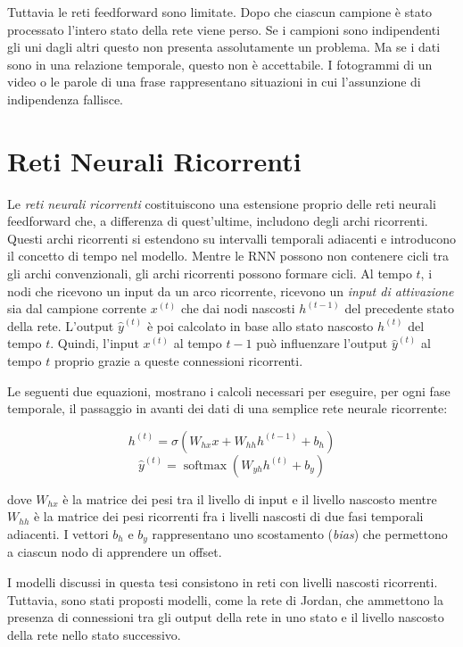 Tuttavia le reti feedforward sono limitate. Dopo che ciascun campione \`e stato
processato l'intero stato della rete viene perso. Se i campioni sono indipendenti
gli uni dagli altri questo non presenta assolutamente un problema. Ma se i dati
sono in una relazione temporale, questo non \`e accettabile. I fotogrammi di un
video o le parole di una frase rappresentano situazioni in cui l'assunzione di
indipendenza fallisce.

\section{Reti Neurali Ricorrenti}

Le \emph{reti neurali ricorrenti} costituiscono una estensione proprio delle reti
neurali feedforward che, a differenza di quest'ultime, includono degli archi ricorrenti.
Questi archi ricorrenti si estendono su intervalli temporali adiacenti e introducono
il concetto di tempo nel modello. Mentre le RNN possono non contenere cicli tra
gli archi convenzionali, gli archi ricorrenti possono formare cicli. Al tempo $t$,
i nodi che ricevono un input da un arco ricorrente, ricevono un \emph{input di
attivazione} sia dal campione corrente $x^{(t)}$ che dai nodi nascosti $h^{(t-1)}$
del precedente stato della rete. L'output $\hat{y}^{(t)}$ \`e poi calcolato in
base allo stato nascosto $h^{(t)}$ del tempo $t$. Quindi, l'input $x^{(t)}$ al
tempo $t-1$ pu\`o influenzare l'output $\hat{y}^{(t)}$ al tempo $t$ proprio grazie
a queste connessioni ricorrenti.

Le seguenti due equazioni, mostrano i calcoli necessari per eseguire, per ogni
fase temporale, il passaggio in avanti dei dati di una semplice rete neurale
ricorrente:

\begin{equation}
  h^{(t)} = \sigma(W_{hx}x + W_{hh}h^{(t-1)} + b_h)
\end{equation}
\begin{equation}
  \hat{y}^{(t)} = \operatorname{softmax}(W_{yh}h^{(t)} + b_y)
\end{equation}

dove $W_{hx}$ \`e la matrice dei pesi tra il livello di input e il livello nascosto
mentre $W_{hh}$ \`e la matrice dei pesi ricorrenti fra i livelli nascosti di due
fasi temporali adiacenti. I vettori $b_h$ e $b_y$ rappresentano uno scostamento
(\emph{bias}) che permettono a ciascun nodo di apprendere un offset.

I modelli discussi in questa tesi consistono in reti con livelli nascosti ricorrenti.
Tuttavia, sono stati proposti modelli, come la rete di Jordan, che ammettono la
presenza di connessioni tra gli output della rete in uno stato e il livello nascosto
della rete nello stato successivo.


